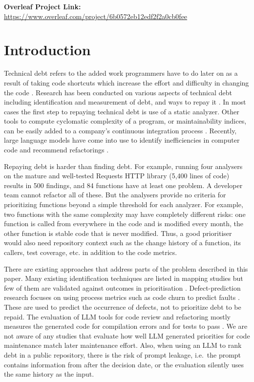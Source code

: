 \documentclass[12pt,onecolumn,draftclsnofoot]{IEEEtran}
\begin{document}
\noindent\textbf{Overleaf Project Link:} \url{https://www.overleaf.com/project/6b0572eb12edf2f2a0cb0fee}

\section{Introduction}

Technical debt refers to the added work programmers have to do later on as a result of taking code shortcuts which increase the effort and difficulty in changing the code \cite{cunningham1992}. Research has been conducted on various aspects of technical debt including identification and measurement of debt, and ways to repay it \cite{kruchten2012,li2015}. In most cases the first step to repaying technical debt is use of a static analyzer. Other tools to compute cyclomatic complexity of a program, or maintainability indices, can be easily added to a company's continuous integration process \cite{hilton2016}. Recently, large language models have come into use to identify inefficiencies in computer code and recommend refactorings \cite{hou2024}.

Repaying debt is harder than finding debt. For example, running four analysers on the mature and well-tested Requests HTTP library (5,400 lines of code) results in 500 findings, and 84 functions have at least one problem. A developer team cannot refactor all of these. But the analysers provide no criteria for prioritizing functions beyond a simple threshold for each analyzer. For example, two functions with the same complexity may have completely different risks: one function is called from everywhere in the code and is modified every month, the other function is stable code that is never modified. Thus, a good prioritiser would also need repository context such as the change history of a function, its callers, test coverage, etc. in addition to the code metrics.

There are existing approaches that address parts of the problem described in this paper. Many existing identification techniques are listed in mapping studies but few of them are validated against outcomes in prioritisation \cite{li2015,alves2016}. Defect-prediction research focuses on using process metrics such as code churn to predict faults \cite{nagappan2005,hassan2009,kamei2013}. These are used to predict the occurrence of defects, not to prioritize debt to be repaid. The evaluation of LLM tools for code review and refactoring mostly measures the generated code for compilation errors and for tests to pass \cite{shirafuji2023,jimenez2024}. We are not aware of any studies that evaluate how well LLM generated priorities for code maintenance match later maintenance effort. Also, when using an LLM to rank debt in a public repository, there is the risk of prompt leakage, i.e.\ the prompt contains information from after the decision date, or the evaluation silently uses the same history as the input.
\end{document}

